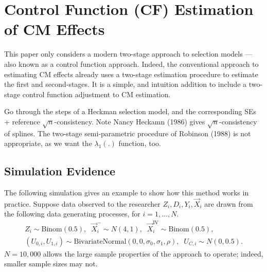 \section{Control Function (CF) Estimation of CM Effects}
\label{sec:controlfun}
This paper only considers a modern two-stage approach to selection models --- also known as a control function approach.
Indeed, the conventional approach to estimating CM effects already uses a two-stage estimation procedure to estimate the first and second-stages.
It is a simple, and intuition addition to include a two-stage control function adjustment to CM estimation.

Go through the steps of a Heckman selection model,  and the corresponding SEs + reference $\sqrt{n}$-consistency.
Note Nancy Heckamn (1986) gives $\sqrt{n}$-consistency of splines.
The two-stage semi-parametric procedure of Robinson (1988) is not appropriate, as we want the $\lambda_1(.)$ function, too.

\subsection{Simulation Evidence}
The following simulation gives an example to show how this method works in practice.
Suppose data observed to the researcher $Z_i, D_i, Y_i, \vec X_i$ are drawn from the following data generating processes, for $i = 1, \hdots, N$.
\begin{align*}
    Z_i \sim \text{Binom}\left(0.5 \right),
    \;\; \vec X_i^- \sim N(4, 1),
    \;\; \vec X_i^{\text{IV}} \sim \text{Binom}\left( 0.5 \right), \\
    \left( U_{0,i}, U_{1,i} \right) \sim
    \text{BivariateNormal}\left( 0, 0, \sigma_0, \sigma_1, \rho \right),
    \;\; U_{C,i} \sim N(0, 0.5).
\end{align*}
$N = 10,000$ allows the large sample properties of the approach to operate; indeed, smaller sample sizes may not.

